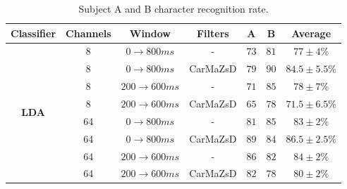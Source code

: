 \begin{table}
    \centering
    \begin{tabular}{ c | c | c | c | c | c || c}
        \hline
        \textbf{Classifier} & \textbf{Channels} & \textbf{Window} & \textbf{Filters} & \textbf{A} & \textbf{B} & \textbf{Average} \\
        \hline\hline
        \multirow{8}{*}{\textbf{LDA}} & 8 & $0 \to 800ms$ & - & $73$ & $81$ & $77\pm4$\%\\
        {} & 8 & $0 \to 800ms$ & CarMaZsD & $79$ & $90$ & $84.5\pm5.5$\%\\
        
        {} & 8 & $200 \to 600ms$ & - & $71$ & $85$ & $78\pm7$\%\\
        {} & 8 & $200 \to 600ms$ & CarMaZsD & $65$ & $78$ & $71.5\pm6.5$\%\\
        
        {} & 64 & $0 \to 800ms$ & - & $81$ & $85$ & $83\pm2$\%\\
        {} & 64 & $0 \to 800ms$ & CarMaZsD & $89$ & $84$ & $86.5\pm2.5$\%\\
        
        {} & 64 & $200 \to 600ms$ & - & $86$ & $82$ & $84\pm2$\%\\
        {} & 64 & $200 \to 600ms$ & CarMaZsD & $82$ & $78$ & $80\pm2$\%\\
        \hline
    \end{tabular}
    \caption{Subject A and B character recognition rate.}
    \label{tab:subject-A-B-char-reco}
\end{table}
\clearpage


